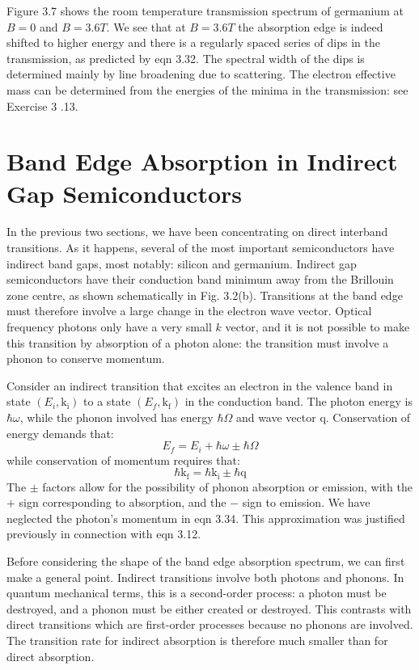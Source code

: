 \documentclass[12pt]{book}
\begin{document}
Figure 3.7 shows the room temperature transmission spectrum of germanium at $B = 0$ and $B = 3.6 T$. We see that at $B = 3.6 T$ the absorption edge is indeed shifted to higher energy and there is a regularly spaced series of dips in the transmission, as predicted by eqn 3.32. The spectral width of the dips is determined mainly by line broadening due to scattering. The electron effective mass can be determined from the energies of the minima in the transmission: see Exercise 3 .13.

\section{Band Edge Absorption in Indirect Gap Semiconductors}

In the previous two sections, we have been concentrating on direct interband transitions. As it happens, several of the most important semiconductors have indirect band gaps, most notably: silicon and germanium. Indirect gap semiconductors have their conduction band minimum away from the Brillouin zone centre, as shown schematically in Fig. 3.2(b). Transitions at the band edge must therefore involve a large change in the electron wave vector. Optical frequency photons only have a very small $k$ vector, and it is not possible to make this transition by absorption of a photon alone: the transition must involve a phonon to conserve momentum.

Consider an indirect transition that excites an electron in the valence band in state $(E_i, \mathrm{k_i})$ to a state $(E_f, \mathrm{k_f})$ in the conduction band. The photon energy is $\hbar\omega$, while the phonon involved has energy $\hbar\Omega$ and wave vector $\mathrm{q}$. Conservation of energy demands that:
\begin{equation}\label{equa:3.33}
  E_f=E_i+\hbar\omega\pm\hbar\Omega
\end{equation}
while conservation of momentum requires that:
\begin{equation}\label{equa:3.34}
  \hbar\mathrm{k_f}=\hbar\mathrm{k_i}\pm\hbar\mathrm{q}
\end{equation}
The $\pm$ factors allow for the possibility of phonon absorption or emission, with the $+$ sign corresponding to absorption, and the $-$ sign to emission. We have neglected the photon's momentum in eqn 3.34. This approximation was justified previously in connection with eqn 3.12.

Before considering the shape of the band edge absorption spectrum, we can first make a general point. Indirect transitions involve both photons and phonons. In quantum mechanical terms, this is a second-order process: a photon must be destroyed, and a phonon must be either created or destroyed. This contrasts with direct transitions which are first-order processes because no phonons are involved. The transition rate for indirect absorption is therefore much smaller than for direct absorption.
\end{document}
